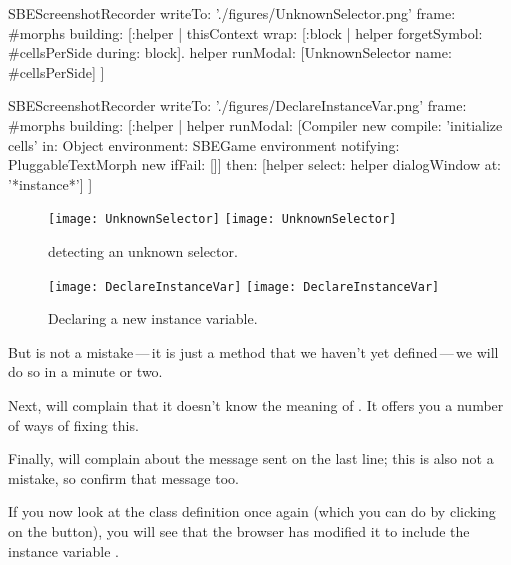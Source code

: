 \documentclass[a4paper,10pt,twoside]{book}
\begin{document}
\begin{ExecuteSmalltalkScript}
SBEScreenshotRecorder writeTo: './figures/UnknownSelector.png' frame: #morphs building: [:helper |
	thisContext wrap: [:block | helper forgetSymbol: #cellsPerSide during: block].
	helper runModal: [UnknownSelector name: #cellsPerSide]
]
\end{ExecuteSmalltalkScript}
\begin{ExecuteSmalltalkScript}
SBEScreenshotRecorder writeTo: './figures/DeclareInstanceVar.png' frame: #morphs building: [:helper |
	helper
		runModal: [Compiler new
			compile: 'initialize cells'
			in: Object
			environment: SBEGame environment
			notifying: PluggableTextMorph new
			ifFail: []]
 		then: [helper select: helper dialogWindow at: '*instance*']
]
\end{ExecuteSmalltalkScript}
\begin{figure}[htb]
\begin{minipage}[t]{0.42\textwidth}
	\centering
	\ifluluelse
		{\texttt{[image: UnknownSelector]}}
		{\texttt{[image: UnknownSelector]}}
	\caption{\squeak detecting an unknown selector.\label{fig:unknownSelector}}
\end{minipage}
\hfill
\begin{minipage}[t]{0.56\textwidth}
	\centering
	\ifluluelse
		{\texttt{[image: DeclareInstanceVar]}}
		{\texttt{[image: DeclareInstanceVar]}}
	\caption{Declaring a new instance variable.\label{fig:declareInstance}}
\end{minipage}
\end{figure}

But  is not a mistake\,---\,it is just a method that we haven't yet defined\,---\,we will do so in a minute or two.


Next, \squeak will complain that it doesn't know the meaning of .
It offers you a number of ways of fixing this.

Finally, \squeak will complain about the message  sent on the last line; this is also not a mistake, so confirm that message too.

If you now look at the class definition once again (which you can do by clicking on the  button), you will see that the browser has modified it to include the instance variable .
\end{document}
